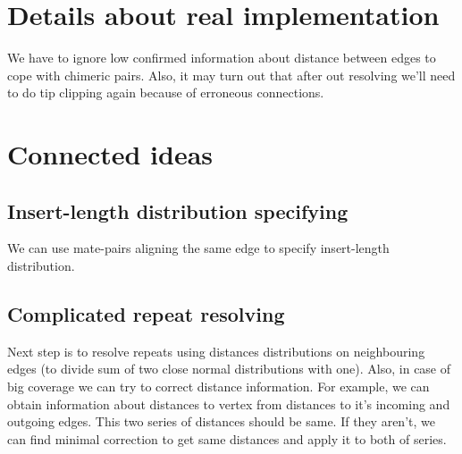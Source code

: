 \documentclass[12pt,a4paper,oneside]{article}
\begin{document}





\section{Details about real implementation}
We have to ignore low confirmed information about distance between edges to cope with chimeric pairs. Also, it may turn out that after out resolving we'll need to do tip clipping again because of erroneous connections.

\section{Connected ideas}
\subsection{Insert-length distribution specifying}
We can use mate-pairs aligning the same edge to specify insert-length distribution.
\subsection{Complicated repeat resolving}
Next step is to resolve repeats using distances distributions on neighbouring edges (to divide sum of two close normal distributions with one). Also, in case of big coverage we can try to correct distance information. For example, we can obtain information about distances to vertex from distances to it's incoming and outgoing edges. This two series  of distances should be same. If they aren't, we can find minimal correction to get same distances and apply it to both of series.    
\end{document}
